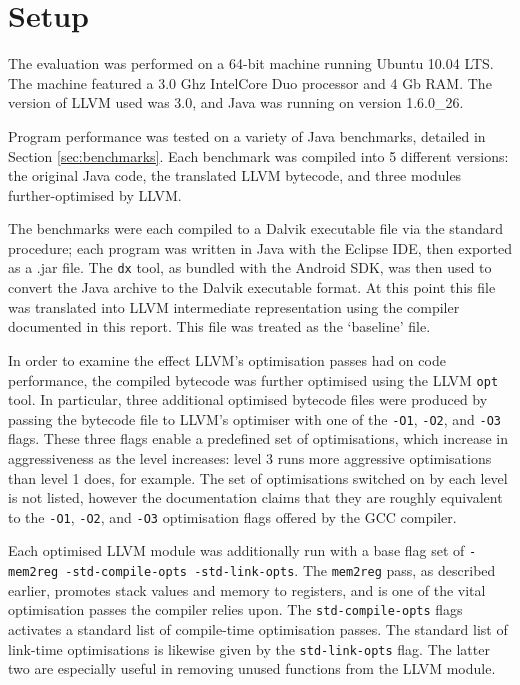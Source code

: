 \section{Setup}
\label{sec:setup}

The evaluation was performed on a 64-bit machine running Ubuntu 10.04 LTS. The machine featured a 3.0 Ghz Intel\textregistered Core Duo processor and 4 Gb RAM. The version of LLVM used was 3.0, and Java was running on version 1.6.0\_26.

Program performance was tested on a variety of Java benchmarks, detailed in Section \ref{sec:benchmarks}. Each benchmark was compiled into 5 different versions: the original Java code, the translated LLVM bytecode, and three modules further-optimised by LLVM. 

The benchmarks were each compiled to a Dalvik executable file via the standard procedure; each program was written in Java with the Eclipse IDE, then exported as a .jar file. The \verb|dx| tool, as bundled with the Android SDK, was then used to convert the Java archive to the Dalvik executable format. At this point this file was translated into LLVM intermediate representation using the compiler documented in this report. This file was treated as the `baseline' file. 

In order to examine the effect LLVM's optimisation passes had on code performance, the compiled bytecode was further optimised using the LLVM \verb|opt| tool. In particular, three additional optimised bytecode files were produced by passing the bytecode file to LLVM's optimiser with one of the \verb|-O1|, \verb|-O2|, and \verb|-O3| flags. These three flags enable a predefined set of optimisations, which increase in aggressiveness as the level increases: level 3 runs more aggressive optimisations than level 1 does, for example. The set of optimisations switched on by each level is not listed, however the documentation claims that they are roughly equivalent to the \verb|-O1|, \verb|-O2|, and \verb|-O3| optimisation flags offered by the GCC compiler.

Each optimised LLVM module was additionally run with a base flag set of \verb|-mem2reg -std-compile-opts -std-link-opts|. The \verb|mem2reg| pass, as described earlier, promotes stack values and memory to registers, and is one of the vital optimisation passes the compiler relies upon. The \verb|std-compile-opts| flags activates a standard list of compile-time optimisation passes. The standard list of link-time optimisations is likewise given by the \verb|std-link-opts| flag. The latter two are especially useful in removing unused functions from the LLVM module.

